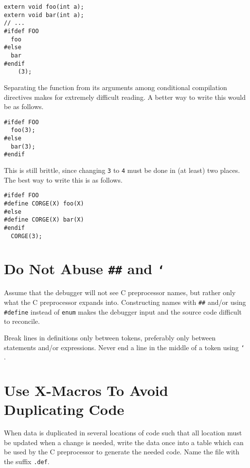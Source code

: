 \documentclass{lulu}
\newcommand{\code}[1]{\texttt{#1}\xspace}
\begin{document}
\begin{verbatim}
extern void foo(int a);
extern void bar(int a);
// ...
#ifdef FOO
  foo
#else
  bar
#endif
    (3);
\end{verbatim}

Separating the function from its arguments among conditional
compilation directives makes for extremely difficult reading.  A
better way to write this would be as follows.

\begin{samepage}
\begin{verbatim}
#ifdef FOO
  foo(3);
#else
  bar(3);
#endif
\end{verbatim}
\end{samepage}

This is still brittle, since changing \code{3} to \code{4} must be
done in (at least) two places.  The best way to write this is as
follows.

\begin{samepage}
\begin{verbatim}
#ifdef FOO
#define CORGE(X) foo(X)
#else
#define CORGE(X) bar(X)
#endif
  CORGE(3);
\end{verbatim}
\end{samepage}

\section{Do Not Abuse \code{\#\#} and \code{\char`\\}}

Assume that the debugger will not see C preprocessor names, but rather
only what the C preprocessor expands into.  Constructing names with
\code{\#\#} and/or using \code{\#define} instead of \code{enum} makes
the debugger input and the source code difficult to reconcile.  

Break lines in definitions only between tokens, preferably only
between statements and/or expressions.  Never end a line in the middle
of a token using \code{\char`\\}.

\section{Use X-Macros To Avoid Duplicating Code}

When data is duplicated in several locations of code such that all
location must be updated when a change is needed, write the data once
into a table which can be used by the C preprocessor to generate the
needed code.  Name the file with the suffix \code{.def}.
\end{document}
